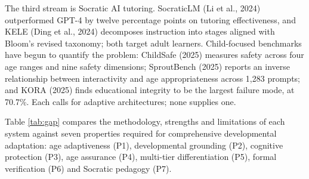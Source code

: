 \documentclass[fleqn,10pt]{wlscirep}
\begin{document}
The third stream is Socratic AI tutoring. SocraticLM (Li et al., 2024)\cite{Li2024} outperformed GPT-4 by twelve percentage points on tutoring effectiveness, and KELE (Ding et al., 2024)\cite{Ding2024} decomposes instruction into stages aligned with Bloom's revised taxonomy; both target adult learners. Child-focused benchmarks have begun to quantify the problem: ChildSafe (2025)\cite{ChildSafe2025} measures safety across four age ranges and nine safety dimensions; SproutBench (2025)\cite{SproutBench2025} reports an inverse relationship between interactivity and age appropriateness across 1,283 prompts; and KORA (2025)\cite{KORA2025} finds educational integrity to be the largest failure mode, at 70.7\%. Each calls for adaptive architectures; none supplies one.

Table \ref{tab:gap} compares the methodology, strengths and limitations of each system against seven properties required for comprehensive developmental adaptation: age adaptiveness (P1), developmental grounding (P2), cognitive protection (P3), age assurance (P4), multi-tier differentiation (P5), formal verification (P6) and Socratic pedagogy (P7).
\end{document}
